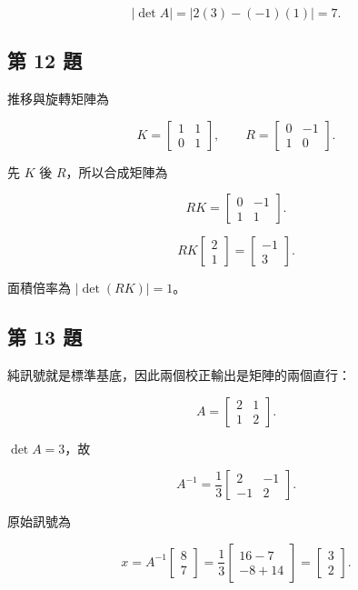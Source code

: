 \documentclass[11pt,a4paper]{article}
\begin{document}
\[
|\det A|=|2(3)-(-1)(1)|=\boxed{7}.
\]

\subsection{第 12 題}\label{ux7b2c-12-ux984c}

推移與旋轉矩陣為

\[
K=\begin{bmatrix}1&1\\0&1\end{bmatrix},
\qquad
R=\begin{bmatrix}0&-1\\1&0\end{bmatrix}.
\]

先 \(K\) 後 \(R\)，所以合成矩陣為

\[
RK=
\boxed{\begin{bmatrix}0&-1\\1&1\end{bmatrix}}.
\]

\[
RK\begin{bmatrix}2\\1\end{bmatrix}
=\boxed{\begin{bmatrix}-1\\3\end{bmatrix}}.
\]

面積倍率為 \(|\det(RK)|=\boxed{1}\)。

\subsection{第 13 題}\label{ux7b2c-13-ux984c}

純訊號就是標準基底，因此兩個校正輸出是矩陣的兩個直行：

\[
\boxed{A=\begin{bmatrix}2&1\\1&2\end{bmatrix}}.
\]

\(\det A=3\)，故

\[
A^{-1}=\frac13\begin{bmatrix}2&-1\\-1&2\end{bmatrix}.
\]

原始訊號為

\[
x=A^{-1}\begin{bmatrix}8\\7\end{bmatrix}
=\frac13
\begin{bmatrix}16-7\\-8+14\end{bmatrix}
=
\boxed{\begin{bmatrix}3\\2\end{bmatrix}}.
\]
\end{document}
